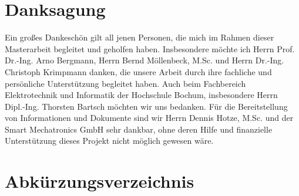\documentclass[12pt,a4paper,oneside,numbers=noenddot,headsepline,captions=tableheading,toc=bibliography,openany,tikz,margin=5mm]{scrbook}
\begin{document}
	
	\chapter*{\textbf{Danksagung}}
	
	
	Ein großes Dankeschön gilt all jenen Personen, die mich im Rahmen dieser Masterarbeit
	begleitet und geholfen haben. Insbesondere möchte ich Herrn Prof. Dr.-Ing. Arno Bergmann, Herrn Bernd Möllenbeck, M.Sc. und Herrn Dr.-Ing. Christoph Krimpmann danken, die unsere Arbeit durch ihre fachliche und persönliche Unterstützung begleitet haben. Auch beim Fachbereich Elektrotechnik und Informatik der Hochschule
	Bochum, insbesondere Herrn Dipl.-Ing. Thorsten Bartsch möchten wir uns bedanken. Für die Bereitstellung von Informationen und Dokumente sind wir Herrn Dennis Hotze, M.Sc. und der Smart Mechatronics GmbH sehr dankbar, ohne deren Hilfe und finanzielle Unterstützung dieses Projekt nicht möglich gewesen wäre. 
	
	
	\tableofcontents
	\cleardoublepage
	
	
	
	\chapter*{Abkürzungsverzeichnis}
	\begin{acronym}[CONSENS]%
			
	\end{acronym}
	\cleardoublepage
	\pagestyle{plain}
	
\end{document}
